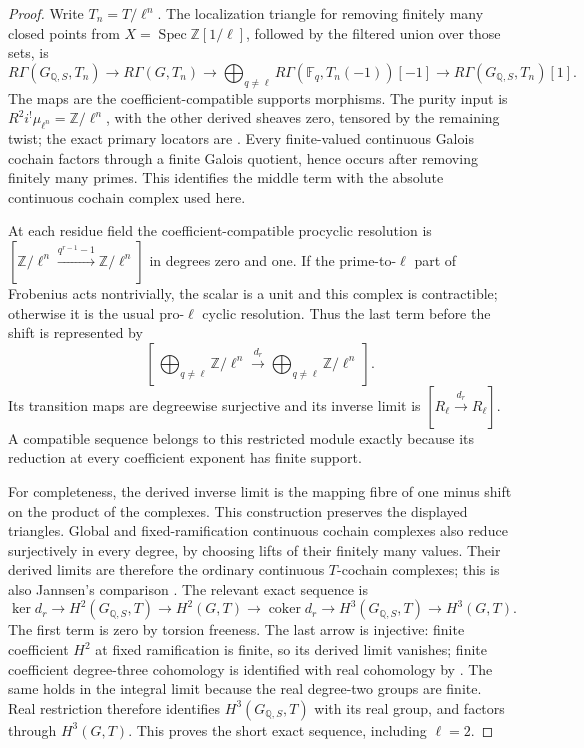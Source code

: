 \begin{proof}
Write $T_n=T/\ell^n$. The localization triangle for removing finitely
many closed points from $X=\operatorname{Spec}\mathbb Z[1/\ell]$,
followed by the filtered union over those sets, is
\[
 R\Gamma(G_{\mathbb Q,S},T_n)\longrightarrow
 R\Gamma(G,T_n)\longrightarrow
 \bigoplus_{q\ne\ell}R\Gamma(\mathbb F_q,T_n(-1))[-1]
 \longrightarrow R\Gamma(G_{\mathbb Q,S},T_n)[1].
\]
The maps are the coefficient-compatible supports morphisms. The
purity input is $R^2i^!\mu_{\ell^n}=\mathbb Z/\ell^n$, with
the other derived sheaves zero, tensored by the remaining twist;
the exact primary locators are
\cite[II.1.7(b), pp.151--152; II.2.9, pp.170--171]{CohMilneADT}.
Every finite-valued continuous Galois cochain factors through a finite
Galois quotient, hence occurs after removing finitely many primes.
This identifies the middle term with the absolute continuous cochain
complex used here.

At each residue field the coefficient-compatible procyclic resolution
is $[\mathbb Z/\ell^n\xrightarrow{q^{r-1}-1}
\mathbb Z/\ell^n]$ in degrees zero and one. If the prime-to-$\ell$
part of Frobenius acts nontrivially, the scalar is a unit and this
complex is contractible; otherwise it is the usual pro-$\ell$ cyclic
resolution. Thus the last term before the shift is represented by
\[
 [\,\bigoplus_{q\ne\ell}\mathbb Z/\ell^n
                   \xrightarrow{d_r}
       \bigoplus_{q\ne\ell}\mathbb Z/\ell^n\,].
\]
Its transition maps are degreewise surjective and its inverse limit is
$[R_\ell\xrightarrow{d_r}R_\ell]$. A compatible sequence belongs
to this restricted module exactly because its reduction at every
coefficient exponent has finite support.

For completeness, the derived inverse limit is the mapping fibre of
one minus shift on the product of the complexes. This construction
preserves the displayed triangles. Global and fixed-ramification
continuous cochain complexes also reduce surjectively in every degree,
by choosing lifts of their finitely many values. Their derived limits
are therefore the ordinary continuous $T$-cochain complexes; this is
also Jannsen's comparison
\cite[(2.1), Theorem (2.2), p.215]{CohJannsen1988}.
The relevant exact sequence is
\[
 \ker d_r\longrightarrow H^2(G_{\mathbb Q,S},T)
 \longrightarrow H^2(G,T)\longrightarrow\operatorname{coker}d_r
 \longrightarrow H^3(G_{\mathbb Q,S},T)
 \longrightarrow H^3(G,T).
\]
The first term is zero by torsion freeness. The last arrow is injective:
finite coefficient $H^2$ at fixed ramification is finite, so its
derived limit vanishes; finite coefficient degree-three cohomology
is identified with real cohomology by
\cite[I.4.10(c), p.57]{CohMilneADT}. The same holds in the integral
limit because the real degree-two groups are finite. Real restriction
therefore identifies $H^3(G_{\mathbb Q,S},T)$ with its real group,
and factors through $H^3(G,T)$. This proves the short exact sequence,
including $\ell=2$.


\end{proof}

